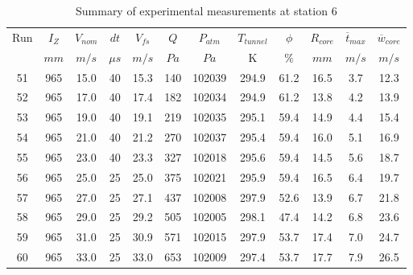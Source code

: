 \begin{table}[H]
\begin{center}
\begin{tabular}{|cccccccccccc|}
	\hline
	Run & $I_Z$ & $V_{nom}$ & $dt$ & $V_{fs}$ & $Q$ & $P_{atm}$ & $T_{tunnel}$ & $\phi$ & $R_{core}$ & $\overline{t}_{max}$ & $\overline{w}_{core}$\\
	  & $mm$ & $m/s$ & $\mu s$ & $m/s$ & $Pa$ & $Pa$ & K & $\%$ & $mm$ & $m/s$ & $m/s$\\
	\hline
	51 & 965 & 15.0 & 40 & 15.3 & 140 & 102039 & 294.9 & 61.2 & 16.5 & 3.7 & 12.3\\
	52 & 965 & 17.0 & 40 & 17.4 & 182 & 102034 & 294.9 & 61.2 & 13.8 & 4.2 & 13.9\\
	53 & 965 & 19.0 & 40 & 19.1 & 219 & 102035 & 295.1 & 59.4 & 14.9 & 4.4 & 15.4\\
	54 & 965 & 21.0 & 40 & 21.2 & 270 & 102037 & 295.4 & 59.4 & 16.0 & 5.1 & 16.9\\
	55 & 965 & 23.0 & 40 & 23.3 & 327 & 102018 & 295.6 & 59.4 & 14.5 & 5.6 & 18.7\\
	56 & 965 & 25.0 & 25 & 25.0 & 375 & 102021 & 295.9 & 59.4 & 16.5 & 6.4 & 19.7\\
	57 & 965 & 27.0 & 25 & 27.1 & 437 & 102008 & 297.9 & 52.6 & 13.9 & 6.7 & 21.8\\
	58 & 965 & 29.0 & 25 & 29.2 & 505 & 102005 & 298.1 & 47.4 & 14.2 & 6.8 & 23.6\\
	59 & 965 & 31.0 & 25 & 30.9 & 571 & 102015 & 297.9 & 53.7 & 17.4 & 7.0 & 24.7\\
	60 & 965 & 33.0 & 25 & 33.0 & 653 & 102009 & 297.4 & 53.7 & 17.7 & 7.9 & 26.5\\
	\hline
\end{tabular}
\caption{Summary of experimental measurements at station 6}
\label{table:experiment_results_6}
\end{center}
\end{table}
